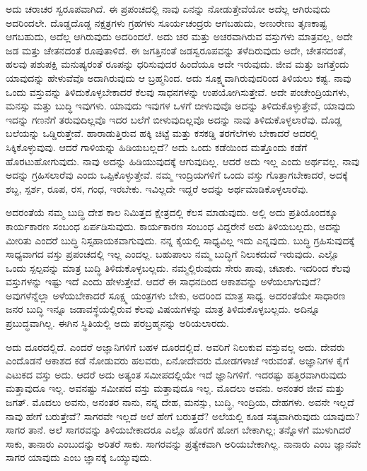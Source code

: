 ಅದು ಚರಾಚರ ಸ್ವರೂಪವಾಗಿದೆ. ಈ ಪ್ರಪಂಚದಲ್ಲಿ ನಾವು ಏನನ್ನು ನೋಡುತ್ತೇವೆಯೋ ಅದೆಲ್ಲ ಆಗಿರುವುದು ಅದರಿಂದಲೇ. ದೊಡ್ಡದೊಡ್ಡ ನಕ್ಷತ್ರಗಳು ಗ್ರಹಗಳು ಸೂರ್ಯಚಂದ್ರರು ಆಗಬಹುದು, ಅಣುರೇಣು ತೃಣಕಾಷ್ಟ ಆಗಬಹುದು, ಅದೆಲ್ಲ ಆಗಿರುವುದು ಅದರಿಂದಲೆ. ಅದು ಚರ ಮತ್ತು ಅಚರವಾಗಿರುವ ವಸ್ತುಗಳು ಮಾತ್ರವಲ್ಲ, ಅದೇ ಜಡ ಮತ್ತು ಚೇತನದಂತೆ ರೂಪುತಾಳಿದೆ. ಈ ಜಗತ್ತಿನಂತೆ ಜಡಸ್ವರೂಪವನ್ನು ತಳೆದಿರುವುದು ಅದೇ, ಚೇತನದಂತೆ, ಹಲವು ಪಶುಪಕ್ಷಿ ಮನುಷ್ಯರಂತೆ ರೂಪನ್ನು ಧರಿಸುವುದರ ಹಿಂದೆಯೂ ಅದೇ ಇರುವುದು. ಜೀವ ಮತ್ತು ಜಗತ್ತೆಂದು ಯಾವುದನ್ನು ಹೇಳುವೆವೊ ಅದಾಗಿರುವುದು ಆ ಬ್ರಹ್ಮನಿಂದ. ಅದು ಸೂಕ್ಷ್ಮವಾಗಿರುವುದರಿಂದ ತಿಳಿಯಲು ಕಷ್ಟ. ನಾವು ಒಂದು ವಸ್ತುವನ್ನು ತಿಳಿದುಕೊಳ್ಳಬೇಕಾದರೆ ಕೆಲವು ಸಾಧನಗಳನ್ನು ಉಪಯೋಗಿಸುತ್ತೇವೆ. ಅದೇ ಪಂಚೇಂದ್ರಿಯಗಳು, ಮನಸ್ಸು ಮತ್ತು ಬುದ್ಧಿ ಇವುಗಳು. ಯಾವುದು ಇವುಗಳ ಒಳಗೆ ಬೀಳುವುವೊ ಅದನ್ನು ತಿಳಿದುಕೊಳ್ಳುತ್ತೇವೆ, ಯಾವುದು ಇದನ್ನು ಗಣನೆಗೆ ತರುವುದಿಲ್ಲವೊ ಇದರ ಬಲೆಗೆ ಬೀಳುವುದಿಲ್ಲವೊ ಅದನ್ನು ನಾವು ತಿಳಿದುಕೊಳ್ಳಲಾರೆವು. ದೊಡ್ಡ ಬಲೆಯನ್ನು ಒಡ್ಡಿರುತ್ತೇವೆ. ಹಾರಾಡುತ್ತಿರುವ ಹಕ್ಕಿ ಚಿಟ್ಟೆ ಮತ್ತು ಕಸಕಡ್ಡಿ ತರಗೆಲೆಗಳು ಬೇಕಾದರೆ ಅದರಲ್ಲಿ ಸಿಕ್ಕಿಕೊಳ್ಳುವುವು. ಆದರೆ ಗಾಳಿಯನ್ನು ಹಿಡಿಯಬಲ್ಲದೆ? ಅದು ಒಂದು ಕಡೆಯಿಂದ ಮತ್ತೊಂದು ಕಡೆಗೆ ಹೊರಟುಹೋಗುವುದು. ನಾವು ಅದನ್ನು ಹಿಡಿಯುವುದಕ್ಕೆ ಆಗುವುದಿಲ್ಲ. ಆದರೆ ಅದು ಇಲ್ಲ ಎಂದು ಅರ್ಥವಲ್ಲ. ನಾವು ಅದನ್ನು ಗ್ರಹಿಸಲಾರೆವು ಎಂದು ಒಪ್ಪಿಕೊಳ್ಳುತ್ತೇವೆ. ನಮ್ಮ ಇಂದ್ರಿಯಗಳಿಗೆ ಒಂದು ವಸ್ತು ಗೊತ್ತಾಗಬೇಕಾದರೆ, ಅದಕ್ಕೆ ಶಬ್ದ, ಸ್ಪರ್ಶ, ರೂಪ, ರಸ, ಗಂಧ, ಇರಬೇಕು. ಇವಿಲ್ಲದೇ ಇದ್ದರೆ ಅದನ್ನು ಅರ್ಥಮಾಡಿಕೊಳ್ಳಲಾರೆವು.

ಅದರಂತೆಯೆ ನಮ್ಮ ಬುದ್ಧಿ ದೇಶ ಕಾಲ ನಿಮಿತ್ತದ ಕ್ಷೇತ್ರದಲ್ಲಿ ಕೆಲಸ ಮಾಡುವುದು. ಅಲ್ಲಿ ಅದು ಪ್ರತಿಯೊಂದಕ್ಕೂ ಕಾರ್ಯಕಾರಣ ಸಂಬಂಧ ಏರ್ಪಡಿಸುವುದು. ಕಾರ್ಯಕಾರಣ ಸಂಬಂಧ ವಿದ್ದರೇನೆ ಅದು ತಿಳಿಯಬಲ್ಲದು, ಅದನ್ನು ಮೀರಿತು ಎಂದರೆ ಬುದ್ಧಿ ನಿಸ್ಸಹಾಯಕವಾಗುವುದು. ನನ್ನ ಕೈಯಲ್ಲಿ ಸಾಧ್ಯವಿಲ್ಲ ಇದು ಎನ್ನವುದು. ಬುದ್ಧಿ ಗ್ರಹಿಸುವುದಕ್ಕೆ ಸಾಧ್ಯವಾಗದ ವಸ್ತು ಪ್ರಪಂಚದಲ್ಲಿ ಇಲ್ಲ ಎಂದಲ್ಲ. ಬಹುಪಾಲು ನಮ್ಮ ಬುದ್ಧಿಗೆ ನಿಲುಕದುದೆ ಇರುವುದು. ಎಲ್ಲೊ ಒಂದು ಸ್ಪಲ್ಪವನ್ನು ಮಾತ್ರ ಬುದ್ಧಿ ತಿಳಿದುಕೊಳ್ಳಬಲ್ಲದು. ನಮ್ಮಲ್ಲಿರುವುದು ಸೇರು ಪಾವು, ಚಟಾಕು. ಇದರಿಂದ ಕೆಲವು ವಸ್ತುಗಳನ್ನು ಇಷ್ಟು ಇದೆ ಎಂದು ಹೇಳುತ್ತೇವೆ. ಆದರೆ ಈ ಸಾಧನದಿಂದ ಆಕಾಶವನ್ನು ಅಳೆಯಲಾಗುವುದೆ? ಅವುಗಳೆನ್ನೆಲ್ಲಾ ಅಳೆಯಬೇಕಾದರೆ ಸೂಕ್ಷ್ಮ ಯಂತ್ರಗಳು ಬೇಕು, ಅದರಿಂದ ಮಾತ್ರ ಸಾಧ್ಯ. ಅದರಂತೆಯೇ ಸಾಧಾರಣ ಜನರ ಬುದ್ಧಿ ಇನ್ನೂ ಜಡಾವಸ್ಥೆಯಲ್ಲಿರುವ ಕೆಲವು ವಿಷಯಗಳನ್ನು ಮಾತ್ರ ತಿಳಿದುಕೊಳ್ಳಬಲ್ಲದು. ಅದಿನ್ನೂ ಪ್ರಬುದ್ಧವಾಗಿಲ್ಲ. ಈಗಿನ ಸ್ಥಿತಿಯಲ್ಲಿ ಅದು ಪರಬ್ರಹ್ಮನನ್ನು ಅರಿಯಲಾರದು.

\newpage

ಅದು ದೂರದಲ್ಲಿದೆ. ಎಂದರೆ ಅಜ್ಞಾನಿಗಳಿಗೆ ಬಹಳ ದೂರದಲ್ಲಿದೆ. ಅವರಿಗೆ ನಿಲುಕುವ ವಸ್ತುವಲ್ಲ ಅದು. ದೇವರು ಎಂದೊಡನೆ ಆಕಾಶದ ಕಡೆ ನೋಡುವರು ಹಲವರು, ಏನೋ\break ದೇವರು ಮೋಡಗಳಾಚೆ ಇರುವಂತೆ. ಅಜ್ಞಾನಿಗಳ ಕೈಗೆ ಎಟುಕದ ವಸ್ತು ಅದು. ಆದರೆ ಅದು ಅತ್ಯಂತ ಸಮೀಪದಲ್ಲಿಯೇ ಇದೆ ಜ್ಞಾನಿಗಳಿಗೆ. ಇದರಷ್ಟು ಹತ್ತಿರವಾಗಿರುವುದು ಮತ್ತಾವುದೂ ಇಲ್ಲ. ಅವನಷ್ಟು ಸಮೀಪದ ವಸ್ತು ಮತ್ತಾವುದೂ ಇಲ್ಲ. ಮೊದಲು ಅವನು. ಅನಂತರ ಜೀವ ಮತ್ತು ಜಗತ್. ಮೊದಲು ಅವನು, ಅನಂತರ ನಾನು, ನನ್ನ ದೇಹ, ಮನಸ್ಸು, ಬುದ್ಧಿ, ಇಂದ್ರಿಯ, ದೇಹಗಳು. ಅವನೇ ಇಲ್ಲದೆ ನಾವು ಹೇಗೆ ಬರುತ್ತೇವೆ? ಸಾಗರವೇ ಇಲ್ಲದೆ ಅಲೆ ಹೇಗೆ ಬರುತ್ತದೆ? ಅಲೆಯಲ್ಲಿ ಕೂಡ ಸತ್ಯವಾಗಿರುವುದು ಯಾವುದು? ಸಾಗರ ತಾನೆ. ಅಲೆ ಸಾಗರವನ್ನು ತಿಳಿಯಬೇಕಾದರೂ ಎಲ್ಲೊ ಹೊರಗೆ ಹೋಗ ಬೇಕಾಗಿಲ್ಲ; ತನ್ನೊಳಗೆ ಮುಳುಗಿದರೆ ಸಾಕು, ತಾನಾರು ಎಂಬುದನ್ನು ಅರಿತರೆ ಸಾಕು. ಸಾಗರವನ್ನು ಪ್ರತ್ಯೇಕವಾಗಿ ಅರಿಯಬೇಕಾಗಿಲ್ಲ. ನಾನಾರು ಎಂಬ ಜ್ಞಾನವೇ ಸಾಗರ ಯಾವುದು ಎಂಬ ಜ್ಞಾನಕ್ಕೆ ಒಯ್ಯುವುದು.


